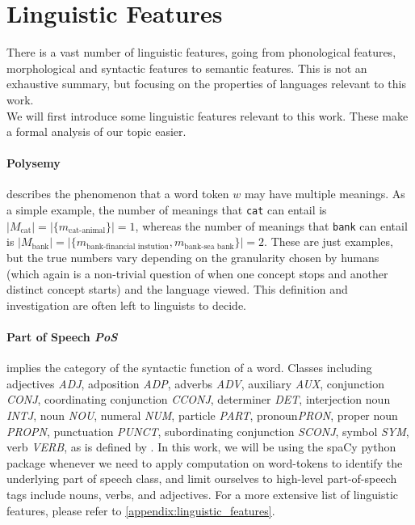 \documentclass[a4paper,12pt,twoside,openright]{report}
\begin{document}
\section{Linguistic Features}

There is a vast number of linguistic features, going from phonological features, morphological and syntactic features to semantic features.
This is not an exhaustive summary, but focusing on the properties of languages relevant to this work. \\

We will first introduce some linguistic features relevant to this work.
These make a formal analysis of our topic easier.

\paragraph{Polysemy} describes the phenomenon that a word token $w$ may have multiple meanings.
As a simple example, the number of meanings that \Verb#cat# can entail is $ | M_\text{cat} | = | \{ m_\text{cat-animal} \} |  = 1$, whereas the number of meanings that \Verb#bank# can entail is $ | M_\text{bank} | = | \{ m_\text{bank-financial instution},  m_\text{bank-sea bank}\} |  = 2$.
These are just examples, but the true numbers vary depending on the granularity chosen by humans (which again is a non-trivial question of when one concept stops and another distinct concept starts) and the language viewed.
This definition and investigation are often left to linguists to decide. \\

\paragraph{Part of Speech \textit{PoS}} implies the category of the syntactic function of a word.
Classes including adjectives \textit{ADJ}, adposition \textit{ADP}, adverbs \textit{ADV}, auxiliary \textit{AUX}, conjunction \textit{CONJ}, coordinating conjunction \textit{CCONJ}, determiner \textit{DET}, interjection noun \textit{INTJ}, noun \textit{NOU}, numeral \textit{NUM}, particle \textit{PART}, pronoun\textit{PRON}, proper noun \textit{PROPN}, punctuation \textit{PUNCT}, subordinating conjunction \textit{SCONJ}, symbol \textit{SYM}, verb \textit{VERB}, as is defined by \cite{spacyb}.
In this work, we will be using the spaCy python package  \cite{spacy} whenever we need to apply computation on word-tokens to identify the underlying part of speech class, and limit ourselves to high-level part-of-speech tags include nouns, verbs, and adjectives.
For a more extensive list of linguistic features, please refer to \ref{appendix:linguistic_features}.
\end{document}
